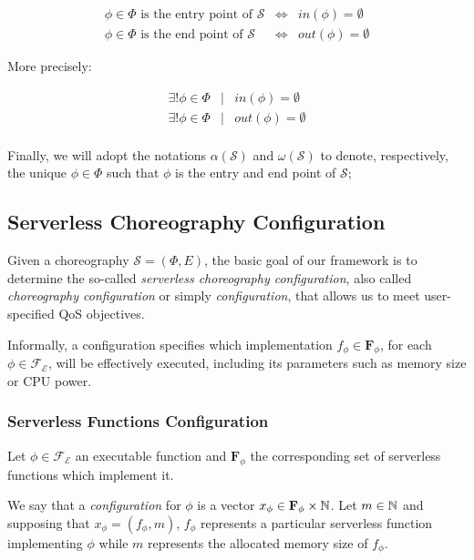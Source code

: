 \begin{eqnarray}
	\phi \in \Phi \text{ is the entry point of } \mathcal{S} & \Leftrightarrow & in(\phi) = \emptyset \\
	\phi \in \Phi \text{ is the end point of } \mathcal{S} & \Leftrightarrow & out(\phi) = \emptyset
\end{eqnarray}

More precisely:

\begin{eqnarray}
	\exists !  \phi \in \Phi &\mid & in(\phi) = \emptyset \\
	\exists !  \phi \in \Phi & \mid & out(\phi) = \emptyset \\
\end{eqnarray}

Finally, we will adopt the notations $\alpha(\mathcal{S})$ and $\omega(\mathcal{S})$ to denote, respectively, the unique $\phi \in \Phi$ such that $\phi$ is the entry and end point of $\mathcal{S}$;

\subsection{Serverless Choreography Configuration}

Given a choreography $\mathcal{S} = (\Phi,E)$, the basic goal of our framework is to determine the so-called \textit{serverless choreography configuration}, also called \textit{choreography configuration} or simply \textit{configuration}, that allows us to meet user-specified QoS objectives.

Informally, a configuration specifies which implementation $f_{\phi} \in \textbf{F}_{\phi}$, for each $\phi \in \mathscr{F_E}$, will be effectively executed, including its parameters such as memory size or CPU power.

\subsubsection{Serverless Functions Configuration}

Let $\phi \in \mathscr{F_E}$ an executable function and $\textbf{F}_{\phi}$ the corresponding set of serverless functions which implement it. 

We say that a \textit{configuration} for $\phi$ is a vector $x_{\phi} \in \textbf{F}_{\phi} \times \mathbb{N}$. Let $m \in \mathbb{N}$ and supposing that $x_{\phi} = (f_{\phi},m)$, $f_{\phi}$ represents a particular serverless function implementing $\phi$ while $m$ represents the allocated memory size of $f_{\phi}$.

